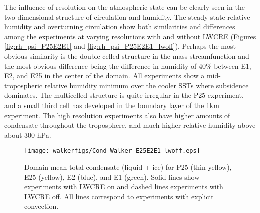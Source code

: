 \documentclass[draft]{agujournal2019}
\begin{document}
The influence of resolution on the atmospheric state can be clearly seen in the two-dimensional structure 
of circulation and humidity.
The steady state relative humidity and overturning circulation show both similarities and differences
among the experiments at varying resolutions with and without LWCRE (Figures \ref{fig:rh_psi_P25E2E1} and 
\ref{fig:rh_psi_P25E2E1_lwoff}).
Perhaps the most obvious similarity is the double celled structure in the mass streamfunction and the most 
obvious difference being the difference in humidity of 40\% between E1, E2, and E25 in the center of the domain.  
All experiments show a mid-tropospheric relative humidity minimum over the cooler SSTs where subsidence 
dominates.  The multicelled structure is quite irregular in the P25 experiment, and a small third cell has 
developed in the boundary layer of the 1km experiment.   The high resolution experiments also have 
higher amounts of condensate throughout the troposphere, and much higher relative humidity 
above about 300 hPa. 


\begin{figure}
  \centering
       \texttt{[image: walkerfigs/Cond\_Walker\_E25E2E1\_lwoff.eps]}
          \caption{Domain mean total condensate (liquid + ice) for P25 (thin yellow), E25 (yellow), 
          E2 (blue), and E1 (green).  Solid lines show experiments with LWCRE on
          and dashed lines experiments with LWCRE off.  All lines correspond to experiments with explicit 
          convection.}
  \label{fig:TotCond}
\end{figure}
 
\end{document}
